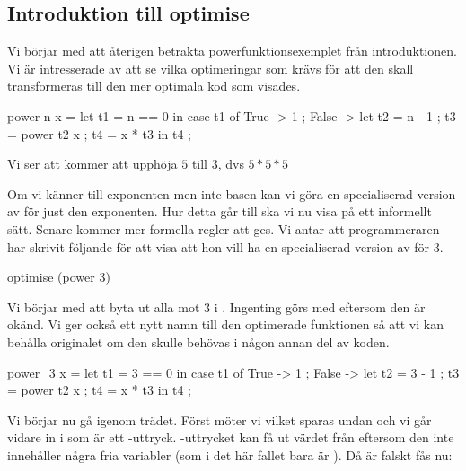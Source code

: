 \documentclass[../Optimise]{subfiles}
\begin{document}
\subsection{Introduktion till optimise}


Vi börjar med att återigen betrakta powerfunktionsexemplet från introduktionen. Vi är
intresserade av att se vilka optimeringar som krävs för att den skall transformeras till den
mer optimala kod som visades.
\begin{codeEx}
power n x = let t1 = n == 0
    in case t1 of
        { True -> 1
        ; False -> let 
            { t2 = n - 1 
            ; t3 = power t2 x
            ; t4 = x * t3
            } in t4
        };
\end{codeEx}
Vi ser att  kommer att upphöja $5$ till $3$, dvs $5 * 5 * 5$

Om vi känner till exponenten men inte basen kan vi göra en specialiserad version av 
för just den exponenten. Hur detta går till ska vi nu visa på ett informellt sätt. 
Senare kommer mer formella regler att ges. Vi antar att programmeraren
har skrivit följande för att visa att hon vill ha en specialiserad version av  för $3$.

\begin{codeEx}
optimise (power 3)
\end{codeEx}

Vi börjar med att byta ut alla  mot $3$ i . Ingenting görs med 
 eftersom den är okänd. Vi ger också ett nytt namn till den optimerade funktionen
så att vi kan behålla originalet om den skulle behövas i någon annan del av koden.
\begin{codeEx}
power_3 x = let t1 = 3 == 0
    in case t1 of
        { True -> 1
        ; False -> let 
            { t2 = 3 - 1 
            ; t3 = power t2 x
            ; t4 = x * t3
            } in t4
        };
\end{codeEx}

Vi börjar nu gå igenom trädet. Först möter vi  vilket 
sparas undan och vi går vidare in i  som är ett -uttryck. 
-uttrycket kan få ut värdet från  eftersom den inte innehåller några 
fria variabler (som i det här fallet bara är ). Då  är falskt fås nu: 
\end{document}
